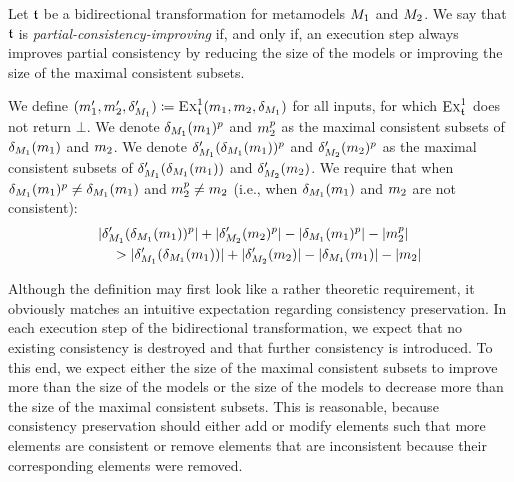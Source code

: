 \begin{definition}
    \label{def:partialconsistencyimprovingtransformation}
    Let $\transformation{t}$ be a bidirectional transformation for metamodels $\metamodel{M}{1}$ and $\metamodel{M}{2}$.
    We say that $\transformation{t}$ is \emph{partial-consistency-improving} if, and only if, an execution step always improves partial consistency by reducing the size of the models or improving the size of the maximal consistent subsets.
    
    We define $(\model{m}{1}', \model{m}{2}', \change{\metamodel{M}{1}}') \equalsperdefinition \function{Ex}_{\transformation{t}}^1(\model{m}{1}, \model{m}{2}, \change{\metamodel{M}{1}})$ for all inputs, for which $\function{Ex}_{\transformation{t}}^1$ does not return $\bot$.
    We denote $\change{\metamodel{M}{1}}(\model{m}{1})^p$ and $\model{m}{2}^p$ as the maximal consistent subsets of $\change{\metamodel{M}{1}}(\model{m}{1})$ and $\model{m}{2}$.
    We denote $\change{\metamodel{M}{1}}'(\change{\metamodel{M}{1}}(\model{m}{1}))^p$ and $\change{\metamodel{M}{2}}'(\model{m}{2})^p$ as the maximal consistent subsets of $\change{\metamodel{M}{1}}'(\change{\metamodel{M}{1}}(\model{m}{1}))$ and $\change{\metamodel{M}{2}}'(\model{m}{2})$.
    We require that when $\change{\metamodel{M}{1}}(\model{m}{1})^p \neq \change{\metamodel{M}{1}}(\model{m}{1})$ and $\model{m}{2}^p \neq \model{m}{2}$ (i.e., when $\change{\metamodel{M}{1}}(\model{m}{1})$ and $\model{m}{2}$ are not consistent):
    \begin{align*}
        &
        \abs{\change{\metamodel{M}{1}}'(\change{\metamodel{M}{1}}(\model{m}{1}))^p} + \abs{\change{\metamodel{M}{2}}'(\model{m}{2})^p} 
        - \abs{\change{\metamodel{M}{1}}(\model{m}{1})^p} - \abs{\model{m}{2}^p} \\
        & \formulaskip
        > \abs{\change{\metamodel{M}{1}}'(\change{\metamodel{M}{1}}(\model{m}{1}))} + \abs{\change{\metamodel{M}{2}}'(\model{m}{2})} 
        - \abs{\change{\metamodel{M}{1}}(\model{m}{1})} - \abs{\model{m}{2}}
    \end{align*}
\end{definition}

Although the definition may first look like a rather theoretic requirement, it obviously matches an intuitive expectation regarding consistency preservation.
In each execution step of the bidirectional transformation, we expect that no existing consistency is destroyed and that further consistency is introduced.
To this end, we expect either the size of the maximal consistent subsets to improve more than the size of the models or the size of the models to decrease more than the size of the maximal consistent subsets.
This is reasonable, because consistency preservation should either add or modify elements such that more elements are consistent or remove elements that are inconsistent because their corresponding elements were removed.

